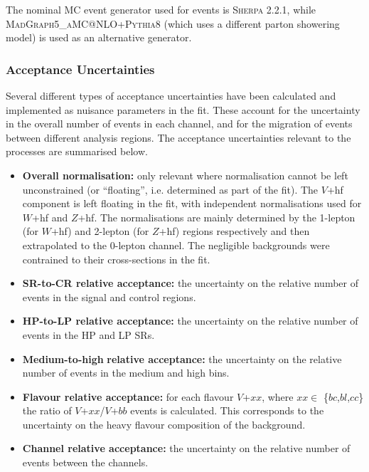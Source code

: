 The nominal MC event generator used for \Vjets events is \textsc{Sherpa 2.2.1}, while \textsc{MadGraph5\_aMC@NLO+Pythia8} (which uses a different parton showering model) is used as an alternative generator.








\subsubsection{\Vjets Acceptance Uncertainties}

Several different types of acceptance uncertainties have been calculated and implemented as nuisance parameters in the fit.
These account for the uncertainty in the overall number of events in each channel, and for the migration of events between different analysis regions.
The acceptance uncertainties relevant to the \Vjets processes are summarised below.
%
\begin{itemize}
    \item \textbf{Overall normalisation:} only relevant where normalisation cannot be left unconstrained (or ``floating'', i.e. determined as part of the fit). The $V$+hf component is left floating in the fit, with independent normalisations used for $W$+hf and $Z$+hf. The normalisations are mainly determined by the 1-lepton (for $W$+hf) and 2-lepton (for $Z$+hf) regions respectively and then extrapolated to the 0-lepton channel.
    The negligible \Vjets backgrounds were contrained to their cross-sections in the fit.
    \item \textbf{SR-to-CR relative acceptance:} the uncertainty on the relative number of \Vjets events in the signal and control regions.
    \item \textbf{HP-to-LP relative acceptance:} the uncertainty on the relative number of \Vjets events in the HP and LP SRs.
    \item \textbf{Medium-to-high} \pTV \textbf{relative acceptance:} the uncertainty on the relative number of \Vjets events in the medium and high \ptv bins.
    \item \textbf{Flavour relative acceptance:} for each flavour $V$+$xx$, where $xx\in$ \{$bc$,$bl$,$cc$\} the ratio of $V$+$xx$/$V$+$bb$ events is calculated. 
    This corresponds to the uncertainty on the heavy flavour composition of the \Vhf background.
    \item \textbf{Channel relative acceptance:} the uncertainty on the relative number of \Vjets events between the channels.
\end{itemize}
